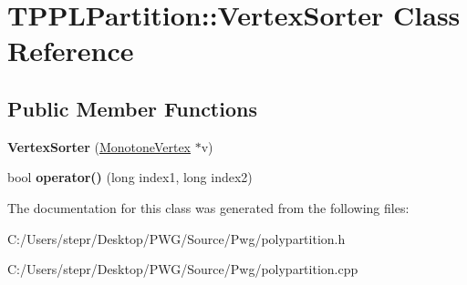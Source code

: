 \hypertarget{class_t_p_p_l_partition_1_1_vertex_sorter}{}\section{T\+P\+P\+L\+Partition\+:\+:Vertex\+Sorter Class Reference}
\label{class_t_p_p_l_partition_1_1_vertex_sorter}
\subsection*{Public Member Functions}
\begin{DoxyCompactItemize}
\item 
\mbox{\label{class_t_p_p_l_partition_1_1_vertex_sorter_a1669e3d31f5ca47a0afa595acc2dc497}} 
{\bfseries Vertex\+Sorter} (\mbox{\hyperlink{struct_t_p_p_l_partition_1_1_monotone_vertex}{Monotone\+Vertex}} $\ast$v)
\item 
\mbox{\label{class_t_p_p_l_partition_1_1_vertex_sorter_a48b6360a3cfd0c500b2872a328f0ed36}} 
bool {\bfseries operator()} (long index1, long index2)
\end{DoxyCompactItemize}


The documentation for this class was generated from the following files\+:\begin{DoxyCompactItemize}
\item 
C\+:/\+Users/stepr/\+Desktop/\+P\+W\+G/\+Source/\+Pwg/polypartition.\+h\item 
C\+:/\+Users/stepr/\+Desktop/\+P\+W\+G/\+Source/\+Pwg/polypartition.\+cpp\end{DoxyCompactItemize}
